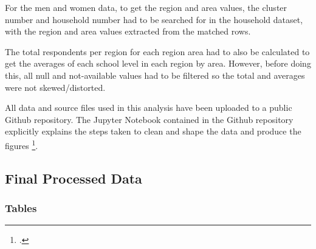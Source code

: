 \documentclass[stu, 12pt, floatsintext,longtable]{apa7}
\begin{document}
For the men and women data, to get the region and area values, the cluster
number and household number had to be searched for
in the household dataset, with the region and area values extracted from
the matched rows.

The total respondents per region for each region area had to also be calculated
to
get the
averages of each school level in each region by area. However, before doing
this,
all null and not-available values had to be filtered so the total and averages
were not skewed/distorted.

All data and source files used in this analysis have been uploaded to a public
Github repository.
The Jupyter Notebook contained in the Github repository explicitly explains the
steps taken to clean and shape the data and produce the figures
\footcite{githubdata}.

\newpage
\subsection{Final Processed Data}
\subsubsection{Tables}
\end{document}
